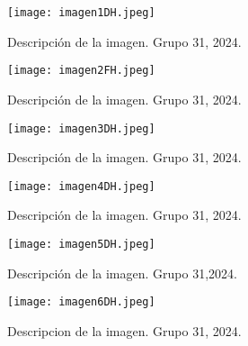 \begin{figure}[h]
    \centering
    \texttt{[image: imagen1DH.jpeg]}
    \caption{Descripción de la imagen. Grupo 31, 2024.}
    \label{fig:No.1}
\end{figure}

\begin{figure}[h]
    \centering
    \texttt{[image: imagen2FH.jpeg]}
    \caption{Descripción de la imagen. Grupo 31, 2024.}
    \label{fig:No.2}
\end{figure}

\begin{figure}[h]
    \centering
    \texttt{[image: imagen3DH.jpeg]}
    \caption{Descripción de la imagen. Grupo 31, 2024.}
    \label{fig:No.3}
\end{figure}

\begin{figure}[h]
    \centering
    \texttt{[image: imagen4DH.jpeg]}
    \caption{Descripción de la imagen. Grupo 31, 2024.}
    \label{fig:No.4}
\end{figure}

\begin{figure}[h]
    \centering
    \texttt{[image: imagen5DH.jpeg]}
    \caption{Descripción de la imagen. Grupo 31,2024.}
    \label{fig:No.5}
\end{figure}

\begin{figure}[h]
    \centering
    \texttt{[image: imagen6DH.jpeg]}
    \caption{Descripcion de la imagen. Grupo 31, 2024.}
    \label{fig:No.6}
\end{figure}


